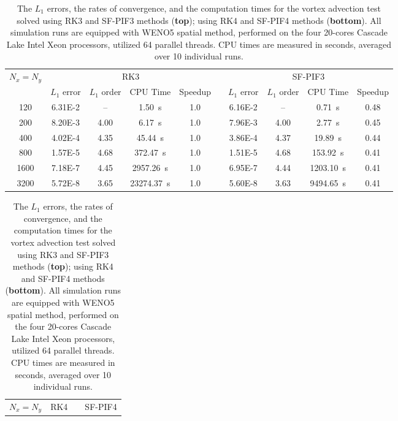 \begin{table}
    \centering
    \caption{The \( L_{1} \) errors, the rates of convergence,
        and the computation times for the vortex advection test
        solved using RK3 and SF-PIF3 methods (\textbf{top});
        using RK4 and SF-PIF4 methods (\textbf{bottom}).
        All simulation runs are equipped with WENO5 spatial method,
        performed on the four 20-cores
        Cascade Lake Intel Xeon processors, utilized 64 parallel threads.
        CPU times are measured in seconds, averaged over 10 individual runs.
    }\label{table:vortex_weno_fourth}
    \begin{adjustbox}{width=\textwidth}
        \begin{tabular}{@{}ccccclcccc@{}}
            \toprule
            \multirow{2}{*}{\( N_{x} = N_{y} \)} & \multicolumn{4}{c}{RK3} &  & \multicolumn{4}{c}{SF-PIF3} \\
            \cmidrule(lr){2-5} \cmidrule(l){7-10}
            & \(L_{1}\) error & \(L_{1}\) order & CPU Time & Speedup &  &
            \(L_{1}\) error & \(L_{1}\) order & CPU Time & Speedup \\ \midrule
            120  & \num{6.31E-2} & \--- & \SI{1.50}{\second}      & 1.0 &  & \num{6.16E-2} & \--- & \SI{0.71}{\second}    & 0.48 \\
            200  & \num{8.20E-3} & 4.00 & \SI{6.17}{\second}      & 1.0 &  & \num{7.96E-3} & 4.00 & \SI{2.77}{\second}    & 0.45 \\
            400  & \num{4.02E-4} & 4.35 & \SI{45.44}{\second}     & 1.0 &  & \num{3.86E-4} & 4.37 & \SI{19.89}{\second}   & 0.44 \\
            800  & \num{1.57E-5} & 4.68 & \SI{372.47}{\second}    & 1.0 &  & \num{1.51E-5} & 4.68 & \SI{153.92}{\second}  & 0.41 \\
            1600 & \num{7.18E-7} & 4.45 & \SI{2957.26}{\second}   & 1.0 &  & \num{6.95E-7} & 4.44 & \SI{1203.10}{\second} & 0.41 \\
            3200 & \num{5.72E-8} & 3.65 & \SI{23274.37}{\second}  & 1.0 &  & \num{5.60E-8} & 3.63 & \SI{9494.65}{\second} & 0.41 \\
        \end{tabular}
    \end{adjustbox}
    \begin{adjustbox}{width=\textwidth}
        \begin{tabular}{@{}ccccclcccc@{}}
            \toprule
            \multirow{2}{*}{\( N_{x} = N_{y} \)} & \multicolumn{4}{c}{RK4} &  & \multicolumn{4}{c}{SF-PIF4} \\

\end{tabular}
\end{adjustbox}
\end{table}
